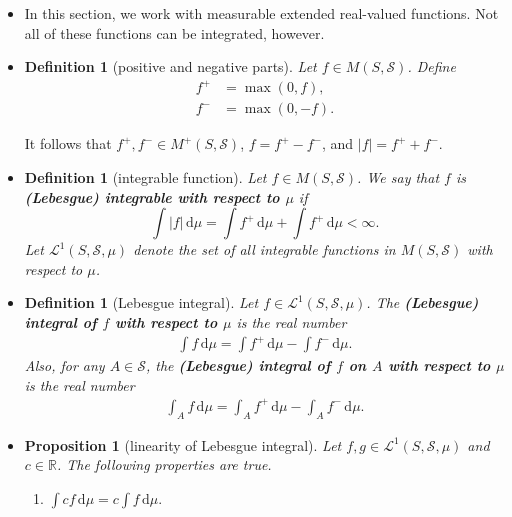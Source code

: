 \documentclass[10pt]{article}
\newtheorem{definition}[lemma]{Definition}
\newtheorem{proposition}[lemma]{Proposition}
\numberwithin{lemma}{section}
\newcommand{\dee}{\mathrm{d}}
\newcommand{\mcal}[1]{\mathcal{#1}}
\newcommand{\Real}{\mathbb{R}}
\begin{document}
\begin{itemize}
  \item In this section, we work with measurable extended real-valued functions. Not all of these functions can be integrated, however.
  
  \item \begin{definition}[positive and negative parts]
    Let $f \in M(S,\mcal{S})$. Define
    \begin{align*}
      f^+ &= \max(0, f), \\
      f^- &= \max(0, -f).
    \end{align*}
  \end{definition}
  It follows that $f^+, f^- \in M^+(S,\mcal{S})$, $f = f^+ - f^-$, and $|f| = f^+ + f^-$.

  \item \begin{definition}[integrable function]
    Let $f \in M(S,\mcal{S})$. We say that $f$ is {\bf (Lebesgue) integrable with respect to $\mu$} if $$\int |f|\, \dee\mu = \int f^+\, \dee\mu + \int f^+\, \dee\mu < \infty.$$ Let $\mcal{L}^1(S, \mcal{S}, \mu)$ denote the set of all integrable functions in $M(S,\mcal{S})$ with respect to $\mu$.
  \end{definition}

  \item \begin{definition}[Lebesgue integral]
    Let $f \in \mcal{L}^1(S,\mcal{S},\mu)$. The {\bf (Lebesgue) integral of $f$ with respect to $\mu$} is the real number
    \begin{align*}
      \int f\, \dee\mu = \int f^+\,\dee\mu - \int f^-\,\dee\mu.
    \end{align*}
    Also, for any $A \in \mcal{S}$, the {\bf (Lebesgue) integral of $f$ on $A$ with respect to $\mu$} is the real number
    \begin{align*}
      \int_A f\, \dee\mu = \int_A f^+\,\dee\mu - \int_A f^-\,\dee\mu.
    \end{align*}
  \end{definition}

  \item \begin{proposition}[linearity of Lebesgue integral]
    Let $f,g \in \mcal{L}^1(S, \mcal{S}, \mu)$ and $c \in \Real$. The following properties are true.
    \begin{enumerate}
      \item $\int cf\, \dee\mu = c \int f\, \dee\mu.$
      

\end{enumerate}
\end{proposition}
\end{itemize}
\end{document}
